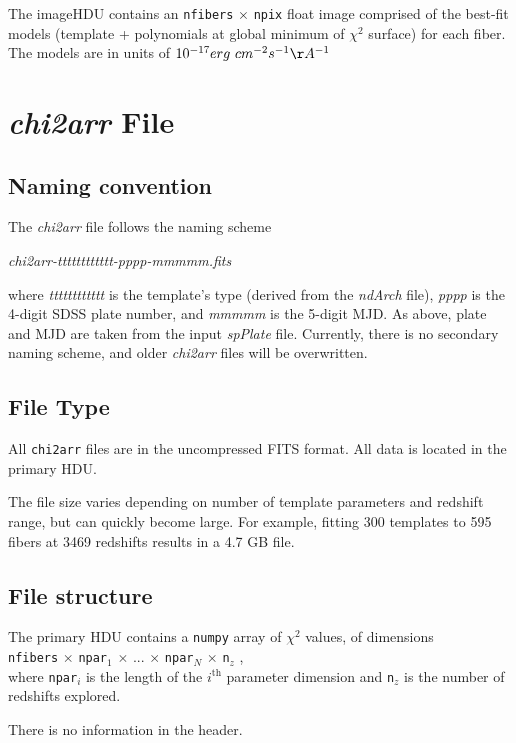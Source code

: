 \documentclass[12pt]{article}
\begin{document}
The imageHDU contains an \texttt{nfibers} $\times$ \texttt{npix} float
image comprised of the best-fit models (template + polynomials at global
minimum of $\chi^2$ surface) for each fiber.  The models are in units of
$10^{-17} erg\ cm^{-2} s^{-1} \AA^{-1}$

\section{\textit{chi2arr} File}

\subsection{Naming convention}

The \textit{chi2arr} file follows the naming scheme

\begin{center}
	\textit{chi2arr-tttttttttttt-pppp-mmmmm.fits}
\end{center}

where \textit{tttttttttttt} is the template's type (derived from the \textit{ndArch} file),
\textit{pppp} is the 4-digit SDSS plate number, and \textit{mmmmm} is the 5-digit
MJD.  As above, plate and MJD are taken from the input \textit{spPlate} file.
Currently, there is no secondary naming scheme, and older \textit{chi2arr} files
will be overwritten.

\subsection{File Type}

All \texttt{chi2arr} files are in the uncompressed FITS format.  All data is located in the
primary HDU.

The file size varies depending on number of template parameters and redshift range,
but can quickly become large.  For example, fitting 300 templates to 595 fibers at
3469 redshifts results in a 4.7 GB file.

\subsection{File structure}

The primary HDU contains a \texttt{numpy} array of $\chi^2$ values, of dimensions \\
\texttt{nfibers} $\times$
\texttt{npar$_1$} $\times$ ... $\times$ \texttt{npar$_N$} $\times$ \texttt{n$_z$} ,\\
where \texttt{npar$_i$} is the length of the $i^{\mathrm{th}}$ parameter dimension
and \texttt{n$_z$} is the number of redshifts explored.

There is no information in the header.
\end{document}

